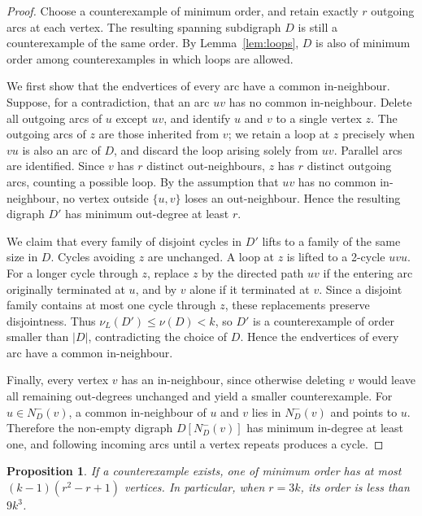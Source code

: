 \documentclass[a4paper,12pt]{article}
\newtheorem{proposition}[theorem]{Proposition}
\numberwithin{equation}{section}
\begin{document}
\begin{proof}
Choose a counterexample of minimum order, and retain exactly $r$
outgoing arcs at each vertex. The resulting spanning subdigraph $D$
is still a counterexample of the same order. By
Lemma~\ref{lem:loops}, $D$ is also of minimum order among
counterexamples in which loops are allowed.

We first show that the endvertices of every arc have a common
in-neighbour. Suppose, for a contradiction, that an arc $uv$ has no
common in-neighbour. Delete all outgoing arcs of $u$ except $uv$, and
identify $u$ and $v$ to a single vertex $z$. The outgoing arcs of $z$
are those inherited from $v$; we retain a loop at $z$ precisely when
$vu$ is also an arc of $D$, and discard the loop arising solely from $uv$.
Parallel arcs are identified. Since $v$ has $r$ distinct out-neighbours,
$z$ has $r$ distinct outgoing arcs, counting a possible loop. By the
assumption that $uv$ has no common in-neighbour, no vertex outside
$\{u,v\}$ loses an out-neighbour. Hence the resulting digraph $D'$ has
minimum out-degree at least $r$.

We claim that every family of disjoint cycles in $D'$ lifts to a
family of the same size in $D$. Cycles avoiding $z$ are unchanged. A
loop at $z$ is lifted to a 2-cycle $uvu$. For a longer cycle through
$z$, replace $z$ by the directed path $uv$ if the entering arc originally
terminated at $u$, and by $v$ alone if it terminated at $v$. Since a
disjoint family contains at most one cycle through $z$, these
replacements preserve disjointness. Thus $\nu_L(D')\le\nu(D)<k$,
so $D'$ is a counterexample of order smaller than $|D|$, contradicting
the choice of $D$. Hence the endvertices of every arc have a common
in-neighbour.

Finally, every vertex $v$ has an in-neighbour, since  otherwise deleting $v$
would leave all remaining out-degrees unchanged and yield a smaller
counterexample. For $u\in N_D^-(v)$, a common in-neighbour of  $u$ and $v$ lies in $N_D^-(v)$ and points to $u$. Therefore the
non-empty digraph $D[N_D^-(v)]$ has minimum in-degree at least one, and
following incoming arcs until a vertex repeats produces a cycle.
\end{proof}


\begin{proposition}\label{prop:order}
If a counterexample exists, one of minimum order has at most
$(k-1)(r^2-r+1)$ vertices. In particular, when $r=3k$, its order is
less than $9k^3$.
\end{proposition}
\end{document}
